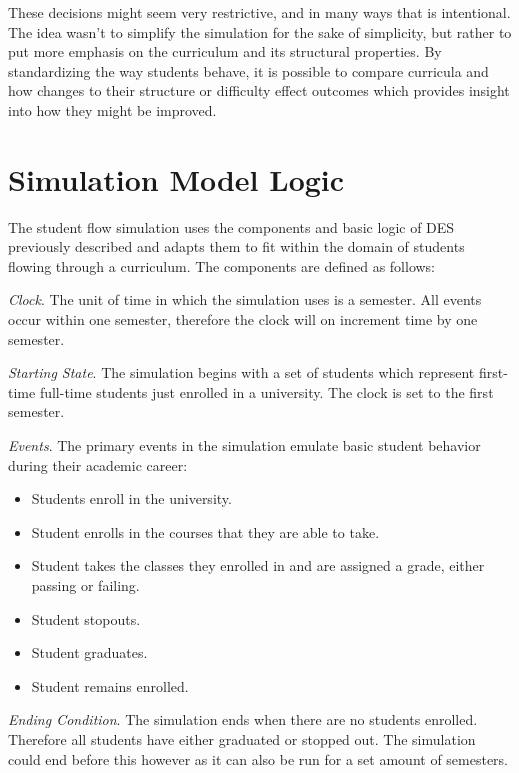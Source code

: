 \documentclass[botnum, fleqn]{unmeethesis}
\begin{document}
    These decisions might seem very restrictive, and in many ways that is intentional. The idea wasn't to simplify the simulation for the sake of simplicity, but rather to put more emphasis on the curriculum and its structural properties. By standardizing the way students behave, it is possible to compare curricula and how changes to their structure or difficulty effect outcomes which provides insight into how they might be improved.

  \section{Simulation Model Logic}
    The student flow simulation uses the components and basic logic of DES previously described and adapts them to fit within the domain of students flowing through a curriculum. The components are defined as follows:

    \textit{Clock}. The unit of time in which the simulation uses is a semester. All events occur within one semester, therefore the clock will on increment time by one semester.

    \textit{Starting State}. The simulation begins with a set of students which represent first-time full-time students just enrolled in a university. The clock is set to the first semester.

    \textit{Events}. The primary events in the simulation emulate basic student behavior during their academic career:
    \begin{itemize}
      \item Students enroll in the university.
      \item Student enrolls in the courses that they are able to take.
      \item Student takes the classes they enrolled in and are assigned a grade, either passing or failing.
      \item Student stopouts.
      \item Student graduates.
      \item Student remains enrolled.
    \end{itemize}

    \textit{Ending Condition}. The simulation ends when there are no students enrolled. Therefore all students have either graduated or stopped out. The simulation could end before this however as it can also be run for a set amount of semesters.

\end{document}

